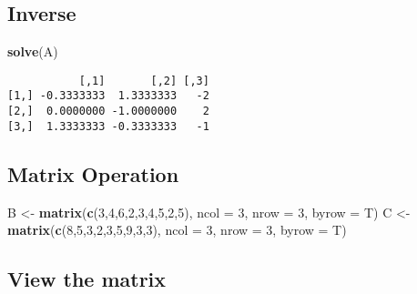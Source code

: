 \documentclass[
]{article}
\newenvironment{Shaded}{\begin{snugshade}}{\end{snugshade}}
\newcommand{\AttributeTok}[1]{\textcolor[rgb]{0.13,0.29,0.53}{#1}}
\newcommand{\DecValTok}[1]{\textcolor[rgb]{0.00,0.00,0.81}{#1}}
\newcommand{\FunctionTok}[1]{\textcolor[rgb]{0.13,0.29,0.53}{\textbf{#1}}}
\newcommand{\NormalTok}[1]{#1}
\newcommand{\OtherTok}[1]{\textcolor[rgb]{0.56,0.35,0.01}{#1}}
\begin{document}
\hypertarget{inverse}{%
\subsection{Inverse}\label{inverse}}

\begin{Shaded}
\begin{Highlighting}[]
\FunctionTok{solve}\NormalTok{(A)}
\end{Highlighting}
\end{Shaded}

\begin{verbatim}
           [,1]       [,2] [,3]
[1,] -0.3333333  1.3333333   -2
[2,]  0.0000000 -1.0000000    2
[3,]  1.3333333 -0.3333333   -1
\end{verbatim}

\hypertarget{matrix-operation}{%
\subsection{Matrix Operation}\label{matrix-operation}}

\begin{Shaded}
\begin{Highlighting}[]
\NormalTok{B }\OtherTok{\textless{}{-}} \FunctionTok{matrix}\NormalTok{(}\FunctionTok{c}\NormalTok{(}\DecValTok{3}\NormalTok{,}\DecValTok{4}\NormalTok{,}\DecValTok{6}\NormalTok{,}\DecValTok{2}\NormalTok{,}\DecValTok{3}\NormalTok{,}\DecValTok{4}\NormalTok{,}\DecValTok{5}\NormalTok{,}\DecValTok{2}\NormalTok{,}\DecValTok{5}\NormalTok{), }\AttributeTok{ncol =} \DecValTok{3}\NormalTok{, }\AttributeTok{nrow =} \DecValTok{3}\NormalTok{, }\AttributeTok{byrow =}\NormalTok{ T)}
\NormalTok{C }\OtherTok{\textless{}{-}} \FunctionTok{matrix}\NormalTok{(}\FunctionTok{c}\NormalTok{(}\DecValTok{8}\NormalTok{,}\DecValTok{5}\NormalTok{,}\DecValTok{3}\NormalTok{,}\DecValTok{2}\NormalTok{,}\DecValTok{3}\NormalTok{,}\DecValTok{5}\NormalTok{,}\DecValTok{9}\NormalTok{,}\DecValTok{3}\NormalTok{,}\DecValTok{3}\NormalTok{), }\AttributeTok{ncol =} \DecValTok{3}\NormalTok{, }\AttributeTok{nrow =} \DecValTok{3}\NormalTok{, }\AttributeTok{byrow =}\NormalTok{ T)}
\end{Highlighting}
\end{Shaded}

\hypertarget{view-the-matrix}{%
\subsection{View the matrix}\label{view-the-matrix}}
\end{document}
